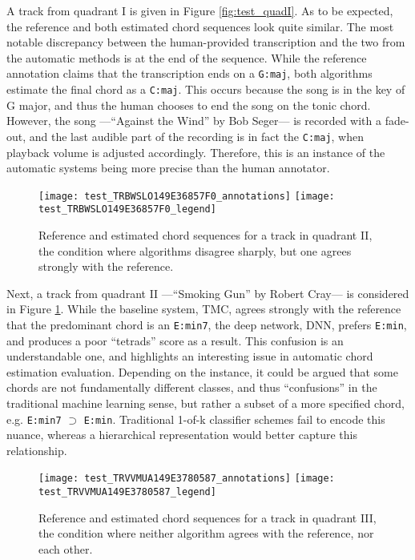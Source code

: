 A track from quadrant I is given in Figure \ref{fig:test_quadI}.
As to be expected, the reference and both estimated chord sequences look quite similar.
The most notable discrepancy between the human-provided transcription and the two from the automatic methods is at the end of the sequence.
While the reference annotation claims that the transcription ends on a \texttt{G:maj}, both algorithms estimate the final chord as a \texttt{C:maj}.
This occurs because the song is in the key of G major, and thus the human chooses to end the song on the tonic chord.
However, the song ---``Against the Wind'' by Bob Seger--- is recorded with a fade-out, and the last audible part of the recording is in fact the \texttt{C:maj}, when playback volume is adjusted accordingly.
Therefore, this is an instance of the automatic systems being more precise than the human annotator.


\begin{figure}[t]
\centering
\texttt{[image: test\_TRBWSLO149E36857F0\_annotations]}
\texttt{[image: test\_TRBWSLO149E36857F0\_legend]}
\caption{Reference and estimated chord sequences for a track in quadrant II, the condition where algorithms disagree sharply, but one agrees strongly with the reference.}
\label{fig:test_quadII}
\end{figure}

Next, a track from quadrant II ---``Smoking Gun'' by Robert Cray--- is considered in Figure \ref{fig:test_quadII}.
While the baseline system, TMC, agrees strongly with the reference that the predominant chord is an \texttt{E:min7}, the deep network, DNN, prefers \texttt{E:min}, and produces a poor ``tetrads'' score as a result.
This confusion is an understandable one, and highlights an interesting issue in automatic chord estimation evaluation.
Depending on the instance, it could be argued that some chords are not fundamentally different classes, and thus ``confusions'' in the traditional machine learning sense, but rather a subset of a more specified chord, e.g. \texttt{E:min7} $\supset$ \texttt{E:min}.
Traditional 1-of-k classifier schemes fail to encode this nuance, whereas a hierarchical representation would better capture this relationship.


\begin{figure}[t]
\centering
\texttt{[image: test\_TRVVMUA149E3780587\_annotations]}
\texttt{[image: test\_TRVVMUA149E3780587\_legend]}
\caption{Reference and estimated chord sequences for a track in quadrant III, the condition where neither algorithm agrees with the reference, nor each other.}
\label{fig:test_quadIII}
\end{figure}

